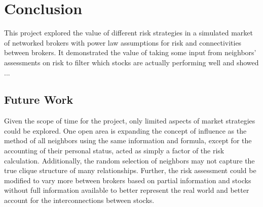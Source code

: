 \documentclass[letterpaper, 11 pt, proceedings]{IEEEtran}
\begin{document}
	
	\section{Conclusion}\label{sec:conclusion}
	This project explored the value of different risk strategies in a simulated market of networked brokers with power law assumptions for risk and connectivities between brokers. It demonstrated the value of taking some input from neighbors' assessments on risk to filter which stocks are actually performing well and showed ... %
	
	\subsection{Future Work}\label{subsec:futurework}
	Given the scope of time for the project, only limited aspects of market strategies could be explored. One open area is expanding the concept of influence as the method of all neighbors using the same information and formula, except for the accounting of their personal status, acted as simply a factor of the risk calculation. Additionally, the random selection of neighbors may not capture the true clique structure of many relationships. Further, the risk assessment could be modified to vary more between brokers based on partial information and stocks without full information available to better represent the real world and better account for the interconnections between stocks.
\end{document}
